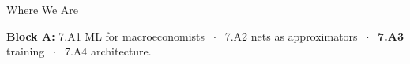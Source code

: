 

\graphicspath{{./figures/}}

\newcommand{\repo}[2]{\href{https://github.com/vonzhg/Macro-2026Fall/blob/main/#1}{\texttt{#2}}}





\makedecktitle

\begin{frame}{Where We Are}
\vspace{-1mm}
\begin{center}
\small \textbf{Block A:} 7.A1 ML for macroeconomists $\;\cdot\;$ 7.A2 nets as approximators $\;\cdot\;$ \textbf{7.A3} training $\;\cdot\;$ 7.A4 architecture.
\end{center}
\end{frame}

